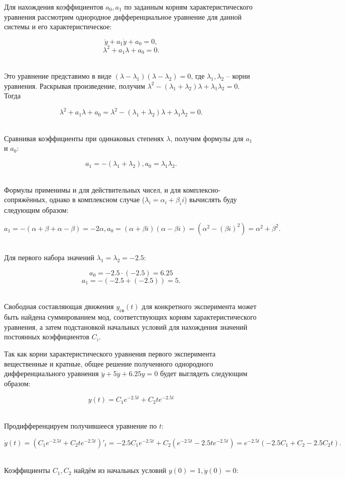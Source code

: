 \documentclass[a4paper]{article}
\begin{document}
Для нахождения коэффициентов $a_0, a_1$ по заданным корням характеристического уравнения рассмотрим однородное дифференциальное уравнение для данной системы и его характеристическое:

$$
\ddot{y}+a_1\dot{y}+a_0=0,
$$
$$
\lambda^2+a_1\lambda+a_0=0.
$$\ 

Это уравнение представимо в виде $(\lambda-\lambda_1)(\lambda-\lambda_2)=0$, где $\lambda_1, \lambda_2$ -- корни уравнения. Раскрывая произведение, получим $\lambda^2 - (\lambda_1+ \lambda_2)\lambda + \lambda_1 \lambda_2=0$. Тогда

$$\lambda^2+a_1\lambda+a_0=\lambda^2 - (\lambda_1+ \lambda_2)\lambda + \lambda_1 \lambda_2=0.$$\ 

Сравнивая коэффициенты при одинаковых степенях $\lambda$, получим формулы для $a_1$ и $a_0$:

$$
a_1=-(\lambda_1+\lambda_2), a_0 = \lambda_1\lambda_2.
$$\

Формулы применимы и для действительных чисел, и для комплексно-сопряжённых, однако в комплексном случае ($\lambda_i=\alpha_i+\beta_i i$) вычислять буду следующим образом:

$$
a_1 = -(\alpha + \beta + \alpha-\beta) = -2\alpha, a_0 = (\alpha+\beta i)(\alpha -\beta i) = (\alpha^2-(\beta i)^2) =\alpha^2+\beta^2.
$$\

Для первого набора значений $\lambda_1 = \lambda_2 = -2.5$:

$$
a_0 = -2.5 \cdot (-2.5) = 6.25
$$
$$
a_1 = -(-2.5 + (-2.5)) = 5.
$$\


Свободная составляющая движения $y_{\text{св}}(t)$ для конкретного эксперимента может быть найдена суммированием мод, соответствующих корням характеристического уравнения, а затем подстановкой начальных условий для нахождения значений постоянных коэффициентов $C_i$.\

Так как корни характеристического уравнения первого эксперимента вещественные и кратные, общее решение полученного однородного дифференциального уравнения $\ddot{y} + 5 \dot{y} + 6.25y = 0$ будет выглядеть следующим образом:

$$
y(t) = C_1e^{-2.5t} + C_2te^{-2.5t}
$$\ 

Продифференцируем получившееся уравнение по $t$:

$$
\dot{y}(t) = (C_1e^{-2.5t}+C_2te^{-2.5t})'_t = -2.5C_1e^{-2.5t}+C_2(e^{-2.5t}-2.5te^{-2.5t}) = e^{-2.5t}(-2.5C_1 + C_2-2.5C_2t).
$$\

Коэффициенты $C_1, C_2$ найдём из начальных условий $y(0) = 1, \dot{y}(0) = 0$:
\end{document}
